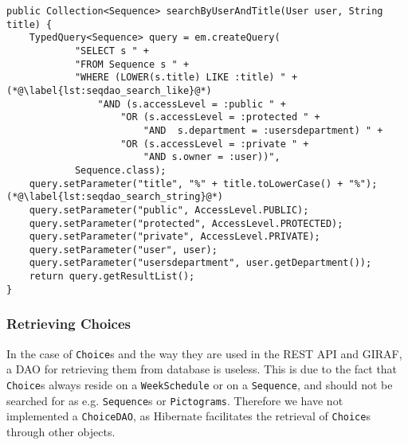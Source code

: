 \begin{lstlisting}[float, floatplacement=h, caption={The method in \texttt{SequenceDaoImpl} which allows for \texttt{Sequence}s to be searched for by title}, label={lst:seqdao_search}]
public Collection<Sequence> searchByUserAndTitle(User user, String title) {
    TypedQuery<Sequence> query = em.createQuery(
            "SELECT s " +
            "FROM Sequence s " +
            "WHERE (LOWER(s.title) LIKE :title) " +(*@\label{lst:seqdao_search_like}@*)
                "AND (s.accessLevel = :public " +
                    "OR (s.accessLevel = :protected " +
                        "AND  s.department = :usersdepartment) " +
                    "OR (s.accessLevel = :private " +
                        "AND s.owner = :user))",
            Sequence.class);
    query.setParameter("title", "%" + title.toLowerCase() + "%");(*@\label{lst:seqdao_search_string}@*)
    query.setParameter("public", AccessLevel.PUBLIC);
    query.setParameter("protected", AccessLevel.PROTECTED);
    query.setParameter("private", AccessLevel.PRIVATE);
    query.setParameter("user", user);
    query.setParameter("usersdepartment", user.getDepartment());
    return query.getResultList();
}
\end{lstlisting}

\subsubsection{Retrieving Choices}
In the case of \texttt{Choice}s and the way they are used in the REST API and GIRAF, a DAO for retrieving them from database is useless.
This is due to the fact that \texttt{Choice}s always reside on a \texttt{WeekSchedule} or on a \texttt{Sequence}, and should not be searched for as e.g. \texttt{Sequence}s or \texttt{Pictograms}.
Therefore we have not implemented a \texttt{ChoiceDAO}, as Hibernate facilitates the retrieval of \texttt{Choice}s through other objects.